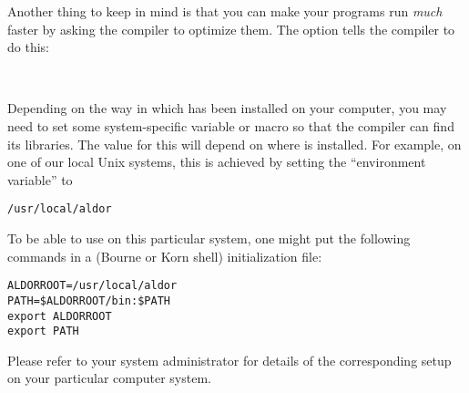 Another thing to keep in mind is that you can make your programs run
{\em much\/} faster by asking the compiler to optimize them.
The  option tells the compiler to do this:

\begin{small}
\osprompt\ 
\end{small}

Depending on the way in which \asharp{} has been installed on your
computer, you may need to set some system-specific variable or macro
so that the compiler can find its libraries. 
The value for this will depend on where \asharp{} is installed.  
For example, on one of our local Unix systems, this is achieved
by setting the ``environment variable''
 to

\begin{small}
\begin{verbatim}
/usr/local/aldor
\end{verbatim}
\end{small}

To be able to use \asharp{} on this particular system,
one might put the following commands in a
(Bourne or Korn shell) initialization file:

\begin{small}%
\begin{verbatim}
ALDORROOT=/usr/local/aldor
PATH=$ALDORROOT/bin:$PATH
export ALDORROOT
export PATH
\end{verbatim}
\end{small}

Please refer to your system administrator for details of the
corresponding setup on your particular computer system.

